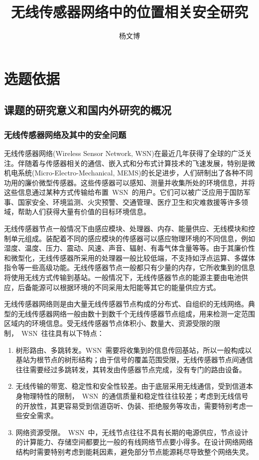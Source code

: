 \documentclass[a4paper,10pt]{article}
\title{无线传感器网络中的位置相关安全研究}
\author{杨文博}
\begin{document}
\maketitle

\section{ 选题依据 } 

\subsection{课题的研究意义和国内外研究的概况}

\subsubsection{无线传感器网络及其中的安全问题}  

无线传感器网络(Wireless Sensor Network, WSN)在最近几年获得了全球的广泛关注。伴随着与传感器相关的通信、嵌入式和分布式计算技术的飞速发展，特别是微机电系统(Micro-Electro-Mechanical, MEMS)的长足进步，人们研制出了各种不同功用的廉价微型传感器。这些传感器可以感知、测量并收集所处的环境信息，并将这些信息通过某种方式传输给布置~WSN~的用户。它们可以被广泛应用于国防军事、国家安全、环境监测、火灾预警、交通管理、医疗卫生和灾难救援等许多领域，帮助人们获得大量有价值的目标环境信息。

无线传感器节点一般情况下由感应模块、处理器、内存、能量供应、无线模块和控制单元组成。装配着不同的感应模块的传感器可以感应物理环境的不同信息，例如湿度、温度、压力、震动、风速、声音、辐射、有毒气体含量等等。由于其廉价性和微型化，无线传感器所采用的处理器一般比较低端，不支持如浮点运算、多媒体指令等一些高级功能。无线传感器节点一般都只有少量的内存，它所收集到的信息将使用无线方式传输到基站。一般情况下，无线传感器节点的能源主要由电池供应，后备能源可以根据环境的不同采用太阳能等其它的能量供应方式。

无线传感器网络则是由大量无线传感器节点构成的分布式、自组织的无线网络。典型的无线传感器网络一般由数十到数千个无线传感器节点组成，用来检测一定范围区域内的环境信息。受无线传感器节点体积小、数量大、资源受限的限制，~WSN~往往具有以下特点：

\begin{enumerate}

\item 树形路由、多跳转发。WSN~需要将收集到的信息传回基站，所以一般构成以基站为根节点的树形结构；由于信号的覆盖范围受限，无线传感器节点间通信往往需要经过多跳转发，其转发由传感器节点完成，没有专门的路由设备。

\item 无线传输的带宽、稳定性和安全性较差。由于底层采用无线通信，受到信道本身物理特性的限制，~WSN~的通信质量和稳定性往往较差；考虑到无线信号的开放性，其更容易受到信道窃听、伪装、拒绝服务等攻击，需要特别考虑一些安全需求。

\item 网络资源受限。~WSN~中，无线节点往往不具有长期的电源供应，节点设计的计算能力、存储空间都要比一般的有线网络节点要小得多。在设计网络网络结构时需要特别考虑到能耗因素，避免部分节点能源耗尽导致整个网络失灵。

\end{enumerate}
\end{document}
